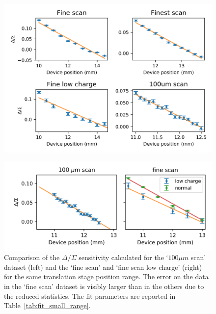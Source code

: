 \begin{figure}[!t] %

\centering
\includegraphics[scale=1, keepaspectratio]{pictures/4_dataset_method2}
\label{fig:all_dataset_1b_method2}

\includegraphics[scale=1, keepaspectratio]{pictures/comparison_100um}
\caption{Comparison of the $\Delta/\Sigma$ sensitivity calculated for the `$100 \mu m$ scan' dataset (left) and the `fine scan' and `fine scan low charge' (right) for the same translation stage position range. The error on the data in the `fine scan' dataset is visibly larger than in the others due to the reduced statistics. The fit parameters are reported in Table~\ref{tab:fit_small_range}.}\label{fig:comparison_100um}

\end{figure}

